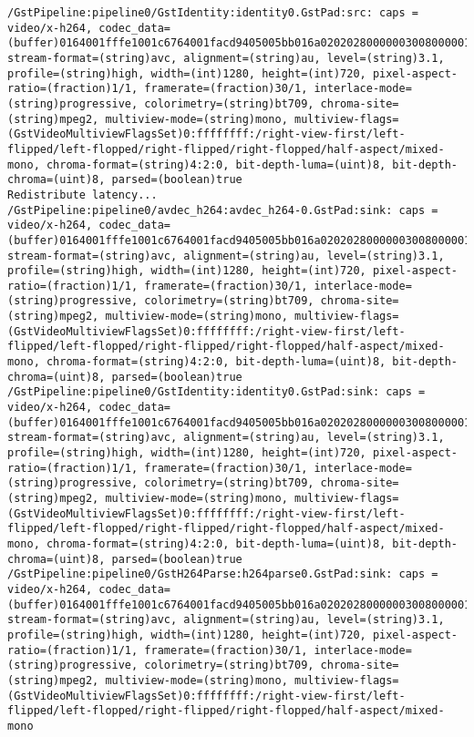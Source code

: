 \documentclass[12pt,oneside]{book}
\begin{document}
\begin{lstlisting}
/GstPipeline:pipeline0/GstIdentity:identity0.GstPad:src: caps = video/x-h264, codec_data=(buffer)0164001fffe1001c6764001facd9405005bb016a02020280000003008000001e478c18cb01000568ebecb22c, stream-format=(string)avc, alignment=(string)au, level=(string)3.1, profile=(string)high, width=(int)1280, height=(int)720, pixel-aspect-ratio=(fraction)1/1, framerate=(fraction)30/1, interlace-mode=(string)progressive, colorimetry=(string)bt709, chroma-site=(string)mpeg2, multiview-mode=(string)mono, multiview-flags=(GstVideoMultiviewFlagsSet)0:ffffffff:/right-view-first/left-flipped/left-flopped/right-flipped/right-flopped/half-aspect/mixed-mono, chroma-format=(string)4:2:0, bit-depth-luma=(uint)8, bit-depth-chroma=(uint)8, parsed=(boolean)true
Redistribute latency...
/GstPipeline:pipeline0/avdec_h264:avdec_h264-0.GstPad:sink: caps = video/x-h264, codec_data=(buffer)0164001fffe1001c6764001facd9405005bb016a02020280000003008000001e478c18cb01000568ebecb22c, stream-format=(string)avc, alignment=(string)au, level=(string)3.1, profile=(string)high, width=(int)1280, height=(int)720, pixel-aspect-ratio=(fraction)1/1, framerate=(fraction)30/1, interlace-mode=(string)progressive, colorimetry=(string)bt709, chroma-site=(string)mpeg2, multiview-mode=(string)mono, multiview-flags=(GstVideoMultiviewFlagsSet)0:ffffffff:/right-view-first/left-flipped/left-flopped/right-flipped/right-flopped/half-aspect/mixed-mono, chroma-format=(string)4:2:0, bit-depth-luma=(uint)8, bit-depth-chroma=(uint)8, parsed=(boolean)true
/GstPipeline:pipeline0/GstIdentity:identity0.GstPad:sink: caps = video/x-h264, codec_data=(buffer)0164001fffe1001c6764001facd9405005bb016a02020280000003008000001e478c18cb01000568ebecb22c, stream-format=(string)avc, alignment=(string)au, level=(string)3.1, profile=(string)high, width=(int)1280, height=(int)720, pixel-aspect-ratio=(fraction)1/1, framerate=(fraction)30/1, interlace-mode=(string)progressive, colorimetry=(string)bt709, chroma-site=(string)mpeg2, multiview-mode=(string)mono, multiview-flags=(GstVideoMultiviewFlagsSet)0:ffffffff:/right-view-first/left-flipped/left-flopped/right-flipped/right-flopped/half-aspect/mixed-mono, chroma-format=(string)4:2:0, bit-depth-luma=(uint)8, bit-depth-chroma=(uint)8, parsed=(boolean)true
/GstPipeline:pipeline0/GstH264Parse:h264parse0.GstPad:sink: caps = video/x-h264, codec_data=(buffer)0164001fffe1001c6764001facd9405005bb016a02020280000003008000001e478c18cb01000568ebecb22c, stream-format=(string)avc, alignment=(string)au, level=(string)3.1, profile=(string)high, width=(int)1280, height=(int)720, pixel-aspect-ratio=(fraction)1/1, framerate=(fraction)30/1, interlace-mode=(string)progressive, colorimetry=(string)bt709, chroma-site=(string)mpeg2, multiview-mode=(string)mono, multiview-flags=(GstVideoMultiviewFlagsSet)0:ffffffff:/right-view-first/left-flipped/left-flopped/right-flipped/right-flopped/half-aspect/mixed-mono

\end{lstlisting}
\end{document}
